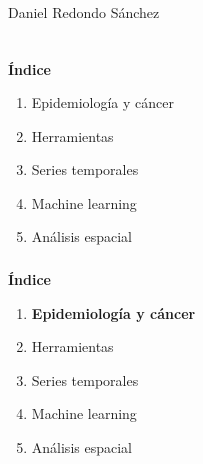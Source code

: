 \documentclass{beamer}
\begin{document}
\begin{frame}
\begin{block}{Daniel Redondo Sánchez}
\begin{columns}
\begin{column}{0.74\textwidth}
			\end{column}
		\end{columns}
	\end{block}

\end{frame}


\begin{frame}\frametitle{}
	
	\Large{\textbf{Índice}}\\[2ex]
	\normalsize
	\begin{enumerate}
		\item Epidemiología y cáncer\\[2ex]
		\item Herramientas\\[2ex]
		\item Series temporales \\[2ex]
		\item Machine learning  \\[2ex]
		\item Análisis espacial \\[2ex]
	\end{enumerate}
	
\end{frame}

\begin{frame}\frametitle{}
	
	\Large{\textbf{Índice}}\\[2ex]
	\normalsize
	\begin{enumerate}
		\item \textbf{Epidemiología y cáncer}\\[2ex]
		\item Herramientas\\[2ex]
		\item Series temporales \\[2ex]
		\item Machine learning  \\[2ex]
		\item Análisis espacial \\[2ex]
	\end{enumerate}
	
\end{frame}
\end{document}
